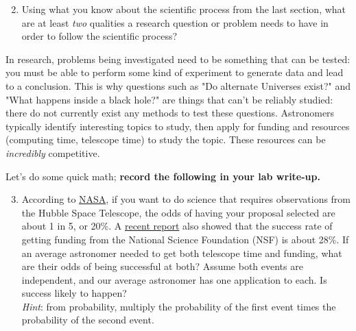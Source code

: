 \documentclass[11pt]{article}%
\begin{document}
\begin{enumerate}
\setcounter{enumi}{1}

\item Using what you know about the scientific process from the last section, what are at least \textit{two} qualities a research question or problem needs to have in order to follow the scientific process?

 
\end{enumerate}

In research, problems being investigated need to be something that can be tested: you must be able to perform some kind of experiment to generate data and lead to a conclusion. This is why questions such as "Do alternate Universes exist?" and "What happens inside a black hole?" are things that can't be reliably studied: there do not currently exist any methods to test these questions. Astronomers typically identify interesting topics to study, then apply for funding and resources (computing time, telescope time) to study the topic. These resources can be \textit{incredibly} competitive. 

\newpage

Let's do some quick math; \textbf{record the following in your lab write-up.}

\begin{enumerate}
\setcounter{enumi}{2}

\item According to \href{https://science.nasa.gov/mission/hubble/overview/hubble-by-the-numbers/}{NASA}, if you want to do science that requires observations from the Hubble Space Telescope, the odds of having your proposal selected are about 1 in 5, or 20\%. A \href{https://www.science.org/content/article/odds-improve-winning-nsf-grants-drop-applications-troubles-some-observers}{recent report} also showed that the success rate of getting funding from the National Science Foundation (NSF) is about 28\%. If an average astronomer needed to get both telescope time and funding, what are their odds of being successful at both? Assume both events are independent, and our average astronomer has one application to each. Is success likely to happen? \\ \textit{Hint}: from probability, multiply the probability of the first event times the probability of the second event.

 
\end{enumerate}
\end{document}
